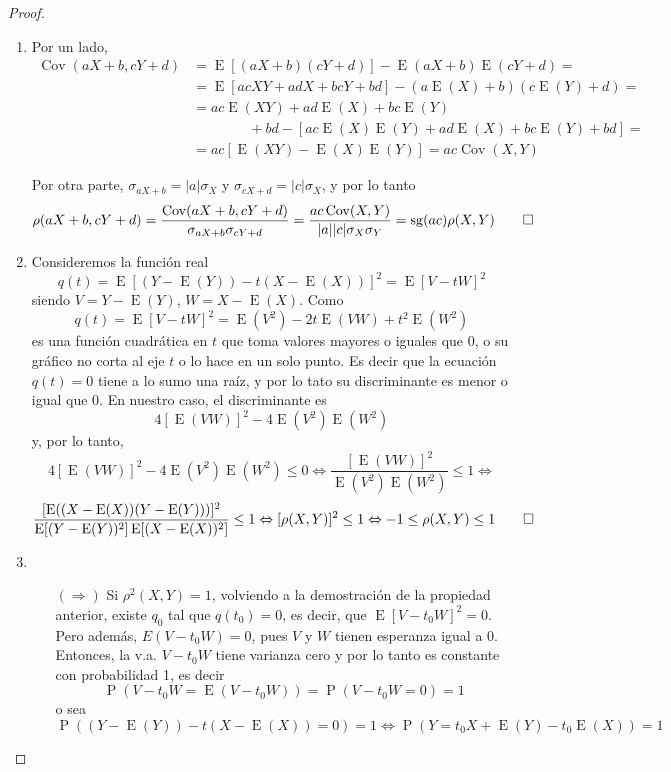 \documentclass[11pt]{article}
\theoremstyle{plain}
\theoremstyle{definition}
\theoremstyle{remark}
\newcommand{\proba}{\ensuremath{\operatorname{P}}}  %
\newcommand{\esp}[0]{\ensuremath{\operatorname{E}}}  %
\newcommand{\cov}[0]{\ensuremath{\operatorname{Cov}}}  %
\begin{document}
      \begin{proof} \ 
        \begin{enumerate}
          \item Por un lado,
          \[ \begin{split}
            \cov(aX + b,cY + d) &= \esp[(aX + b)(cY + d)] - \esp(aX + b) \esp(cY + d) = \\
            &= \esp[acXY + adX + bcY + bd ] - (a \esp(X) + b)(c \esp(Y) + d) = \\
            &= ac \esp(XY) + ad \esp(X) + bc \esp(Y) \\
            &\qquad \qquad + bd - [ac \esp(X) \esp(Y) + ad \esp(X) + bc \esp(Y) + bd] = \\
            &= ac [\esp(XY) - \esp(X) \esp(Y)] = ac \cov(X,Y)
          \end{split} \]

          Por otra parte, $\sigma_{aX + b} = \vert a \vert \sigma_X$ y $\sigma_{cX + d} = \vert c \vert \sigma_X$, y por lo tanto
          \[ \rho(aX + b,cY + d) = \frac{\cov(aX + b, cY + d)}{\sigma_{aX + b} \sigma_{cY + d}} = \frac{ac \cov(X,Y)}{\vert a \vert \vert c \vert \sigma_X  \sigma_Y} = \operatorname{sg}(ac) \rho(X,Y) \qedhere \]
          
          \item Consideremos la función real
          \[ q(t) = \esp[(Y - \esp(Y)) - t(X - \esp(X))]^2 = \esp[V - tW]^2 \]
          siendo $V = Y - \esp(Y)$, $W = X - \esp(X)$. Como
          \[ q(t) = \esp[V - tW]^2 = \esp(V^2) - 2t \esp(VW) + t^2 \esp(W^2) \]
          es una función cuadrática en $t$ que toma valores mayores o iguales que 0, o su gráfico no corta al eje $t$ o lo hace en un solo punto. Es decir que la ecuación $q(t) = 0$ tiene a lo sumo una raíz, y por lo tato su discriminante es menor o igual que 0. En nuestro caso, el discriminante es
          \[ 4[\esp(VW)]^2 - 4 \esp(V^2) \esp(W^2) \]
          y, por lo tanto,
          \[ 4[\esp(VW)]^2 - 4 \esp(V^2) \esp(W^2) \leq 0 \Leftrightarrow \frac{[\esp(VW)]^2}{\esp(V^2) \esp(W^2)} \leq 1 \Leftrightarrow\]
          \[ \frac{[\esp((X - \esp(X))(Y - \esp(Y)))]^2}{\esp[(Y - \esp(Y))^2] \esp[(X - \esp(X))^2]} \leq 1 \Leftrightarrow [\rho(X,Y)]^2 \leq 1 \Leftrightarrow -1 \leq \rho(X,Y) \leq 1 \qedhere \]
          
          \item \begin{itemize}
            \item[$(\Rightarrow)$] Si $\rho^2(X,Y) = 1$, volviendo a la demostración de la propiedad anterior, existe $q_0$ tal que $q(t_0) = 0$, es decir, que $\esp[V - t_0 W]^2 = 0$.
            Pero además, $E(V - t_0 W) = 0$, pues $V$ y $W$ tienen esperanza igual a 0. Entonces, la v.a. $V - t_0 W$ tiene varianza cero y por lo tanto es constante con probabilidad 1, es decir
            \[ \proba(V - t_0 W = \esp(V - t_0 W)) = \proba(V - t_0 W = 0) = 1 \]
            o sea
            \[ \proba((Y - \esp(Y)) - t(X - \esp(X)) = 0) = 1 \Leftrightarrow \proba(Y = t_0X + \esp(Y) - t_0 \esp(X)) = 1\]


\end{itemize}
\end{enumerate}
\end{proof}
\end{document}
